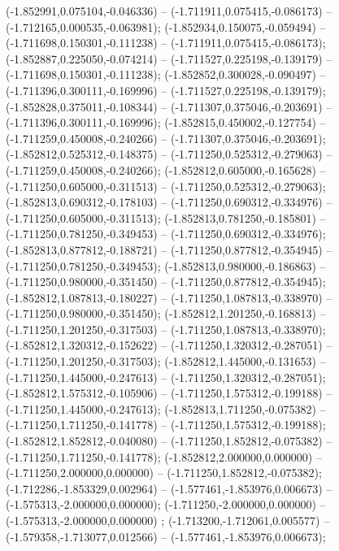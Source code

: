  (-1.852991,0.075104,-0.046336) -- (-1.711911,0.075415,-0.086173) -- (-1.712165,0.000535,-0.063981);
 (-1.852934,0.150075,-0.059494) -- (-1.711698,0.150301,-0.111238) -- (-1.711911,0.075415,-0.086173);
 (-1.852887,0.225050,-0.074214) -- (-1.711527,0.225198,-0.139179) -- (-1.711698,0.150301,-0.111238);
 (-1.852852,0.300028,-0.090497) -- (-1.711396,0.300111,-0.169996) -- (-1.711527,0.225198,-0.139179);
 (-1.852828,0.375011,-0.108344) -- (-1.711307,0.375046,-0.203691) -- (-1.711396,0.300111,-0.169996);
 (-1.852815,0.450002,-0.127754) -- (-1.711259,0.450008,-0.240266) -- (-1.711307,0.375046,-0.203691);
 (-1.852812,0.525312,-0.148375) -- (-1.711250,0.525312,-0.279063) -- (-1.711259,0.450008,-0.240266);
 (-1.852812,0.605000,-0.165628) -- (-1.711250,0.605000,-0.311513) -- (-1.711250,0.525312,-0.279063);
 (-1.852813,0.690312,-0.178103) -- (-1.711250,0.690312,-0.334976) -- (-1.711250,0.605000,-0.311513);
 (-1.852813,0.781250,-0.185801) -- (-1.711250,0.781250,-0.349453) -- (-1.711250,0.690312,-0.334976);
 (-1.852813,0.877812,-0.188721) -- (-1.711250,0.877812,-0.354945) -- (-1.711250,0.781250,-0.349453);
 (-1.852813,0.980000,-0.186863) -- (-1.711250,0.980000,-0.351450) -- (-1.711250,0.877812,-0.354945);
 (-1.852812,1.087813,-0.180227) -- (-1.711250,1.087813,-0.338970) -- (-1.711250,0.980000,-0.351450);
 (-1.852812,1.201250,-0.168813) -- (-1.711250,1.201250,-0.317503) -- (-1.711250,1.087813,-0.338970);
 (-1.852812,1.320312,-0.152622) -- (-1.711250,1.320312,-0.287051) -- (-1.711250,1.201250,-0.317503);
 (-1.852812,1.445000,-0.131653) -- (-1.711250,1.445000,-0.247613) -- (-1.711250,1.320312,-0.287051);
 (-1.852812,1.575312,-0.105906) -- (-1.711250,1.575312,-0.199188) -- (-1.711250,1.445000,-0.247613);
 (-1.852813,1.711250,-0.075382) -- (-1.711250,1.711250,-0.141778) -- (-1.711250,1.575312,-0.199188);
 (-1.852812,1.852812,-0.040080) -- (-1.711250,1.852812,-0.075382) -- (-1.711250,1.711250,-0.141778);
 (-1.852812,2.000000,0.000000) -- (-1.711250,2.000000,0.000000) -- (-1.711250,1.852812,-0.075382);
 (-1.712286,-1.853329,0.002964) -- (-1.577461,-1.853976,0.006673) -- (-1.575313,-2.000000,0.000000);
 (-1.711250,-2.000000,0.000000) -- (-1.575313,-2.000000,0.000000) ;
 (-1.713200,-1.712061,0.005577) -- (-1.579358,-1.713077,0.012566) -- (-1.577461,-1.853976,0.006673);
